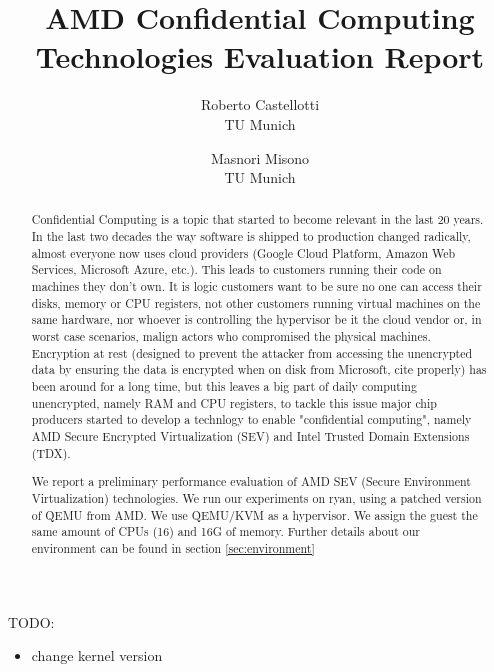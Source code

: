 \documentclass[twocolumn]{article}
\begin{document}
\date{}
\title{\Large \bf AMD Confidential Computing Technologies Evaluation Report}
\author{{\rm Roberto Castellotti}\\TU Munich \and {\rm Masnori Misono}\\TU Munich}
\maketitle
TODO:
\begin{itemize}
    \item change kernel version
\end{itemize}

\begin{abstract}
    Confidential Computing is a topic that started to become relevant in the last 20 years. In the last two decades the way software is shipped to production changed radically, almost everyone now uses cloud providers (Google Cloud Platform, Amazon Web Services, Microsoft Azure, etc.). This leads to customers running their code on machines they don't own. It is logic customers want to be sure no one can access their disks, memory or CPU registers, not other customers running virtual machines on the same hardware, nor whoever is controlling the hypervisor be it  the cloud vendor  or, in worst case scenarios, malign actors who compromised the physical machines. Encryption at rest (designed to prevent the attacker from accessing the unencrypted data by ensuring the data is encrypted when on disk from Microsoft, cite properly) has been around for a long time, but this leaves a big part of daily computing unencrypted, namely RAM and CPU registers, to tackle this issue major chip producers started to develop a technlogy to enable "confidential computing", namely AMD Secure Encrypted Virtualization (SEV) and Intel Trusted Domain Extensions (TDX).


    We report a preliminary performance evaluation of AMD SEV (Secure Environment Virtualization) technologies.
    We run our experiments on ryan, using a patched version of QEMU from AMD. We use QEMU/KVM as a hypervisor. We assign the guest the same amount of CPUs (16) and 16G of memory. Further details about our environment can be found in section \ref{sec:environment}

\end{abstract}
\end{document}
